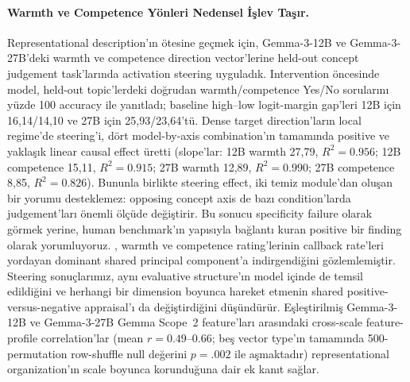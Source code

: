 \documentclass[twocolumn]{article}
\begin{document}
\paragraph{Warmth ve Competence Yönleri Nedensel İşlev Taşır.}
Representational description'ın ötesine geçmek için, Gemma-3-12B ve
Gemma-3-27B'deki warmth ve competence direction vector'lerine held-out concept
judgement task'larında activation steering uyguladık. Intervention öncesinde
model, held-out topic'lerdeki doğrudan warmth/competence Yes/No sorularını yüzde
100 accuracy ile yanıtladı; baseline high--low logit-margin gap'leri 12B için
16,14/14,10 ve 27B için 25,93/23,64'tü. Dense target direction'ların local
regime'de steering'i, dört model-by-axis combination'ın tamamında positive ve
yaklaşık linear causal effect üretti (slope'lar: 12B warmth 27,79,
$R^2 = 0.956$; 12B competence 15,11, $R^2 = 0.915$; 27B warmth 12,89,
$R^2 = 0.990$; 27B competence 8,85, $R^2 = 0.826$). Bununla birlikte steering
effect, iki temiz module'dan oluşan bir yorumu desteklemez: opposing concept
axis de bazı condition'larda judgement'ları önemli ölçüde değiştirir. Bu sonucu
specificity failure olarak görmek yerine, human benchmark'ın yapısıyla bağlantı
kuran positive bir finding olarak yorumluyoruz. \citet{gallo2024warmth}, warmth
ve competence rating'lerinin callback rate'leri yordayan dominant shared
principal component'a indirgendiğini gözlemlemiştir. Steering sonuçlarımız, aynı
evaluative structure'ın model içinde de temsil edildiğini ve herhangi bir
dimension boyunca hareket etmenin shared positive-versus-negative appraisal'ı
da değiştirdiğini düşündürür. Eşleştirilmiş Gemma-3-12B ve Gemma-3-27B Gemma
Scope~2 feature'ları arasındaki cross-scale feature-profile correlation'lar
(mean $r = 0.49$--$0.66$; beş vector type'ın tamamında 500-permutation
row-shuffle null değerini $p = .002$ ile aşmaktadır) representational
organization'ın scale boyunca korunduğuna dair ek kanıt sağlar.
\end{document}
